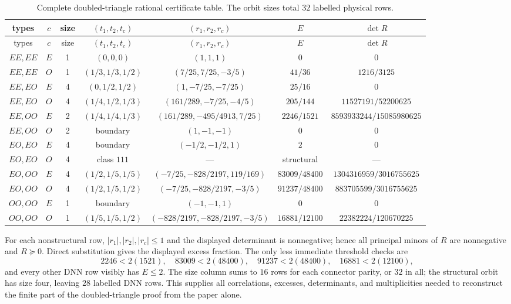 \documentclass[11pt]{article}
\theoremstyle{remark}
\begin{document}
\begin{landscape}
\begin{longtable}{ccccccc}
\caption{Complete doubled-triangle rational certificate table.  The orbit
sizes total $32$ labelled physical rows.}\label{tab:dtri-complete}\\
\toprule
types&$c$&size&$(t_1,t_2,t_c)$&$(r_1,r_2,r_c)$&$E$&$\det R$\\
\midrule
\endfirsthead
\toprule
types&$c$&size&$(t_1,t_2,t_c)$&$(r_1,r_2,r_c)$&$E$&$\det R$\\
\midrule
\endhead
$EE,EE$&$E$&1&$(0,0,0)$&$(1,1,1)$&$0$&$0$\\
$EE,EE$&$O$&1&$(1/3,1/3,1/2)$&$(7/25,7/25,-3/5)$&$41/36$&$1216/3125$\\
$EE,EO$&$E$&4&$(0,1/2,1/2)$&$(1,-7/25,-7/25)$&$25/16$&$0$\\
$EE,EO$&$O$&4&$(1/4,1/2,1/3)$&$(161/289,-7/25,-4/5)$&$205/144$&$11527191/52200625$\\
$EE,OO$&$E$&2&$(1/4,1/4,1/3)$&$(161/289,-495/4913,7/25)$&$2246/1521$&$8593933244/15085980625$\\
$EE,OO$&$O$&2&boundary&$(1,-1,-1)$&$0$&$0$\\
$EO,EO$&$E$&4&boundary&$(-1/2,-1/2,1)$&$2$&$0$\\
$EO,EO$&$O$&4&class $111$&---&structural&---\\
$EO,OO$&$E$&4&$(1/2,1/5,1/5)$&$(-7/25,-828/2197,119/169)$&$83009/48400$&$1304316959/3016755625$\\
$EO,OO$&$O$&4&$(1/2,1/5,1/2)$&$(-7/25,-828/2197,-3/5)$&$91237/48400$&$883705599/3016755625$\\
$OO,OO$&$E$&1&boundary&$(-1,-1,1)$&$0$&$0$\\
$OO,OO$&$O$&1&$(1/5,1/5,1/2)$&$(-828/2197,-828/2197,-3/5)$&$16881/12100$&$22382224/120670225$\\
\bottomrule
\end{longtable}
\end{landscape}

For each nonstructural row, $|r_1|,|r_2|,|r_c|\leq1$ and the displayed
determinant is nonnegative; hence all principal minors of $R$ are nonnegative
and $R\succeq0$.  Direct substitution gives the displayed excess fraction.
The only less immediate threshold checks are
\[
2246<2(1521),\quad 83009<2(48400),\quad
91237<2(48400),\quad 16881<2(12100),
\]
and every other DNN row visibly has $E\leq2$.  The size column sums to
$16$ rows for each connector parity, or $32$ in all; the structural orbit has
size four, leaving $28$ labelled DNN rows.  This supplies all correlations,
excesses, determinants, and multiplicities needed to reconstruct the finite
part of the doubled-triangle proof from the paper alone.
\end{document}
